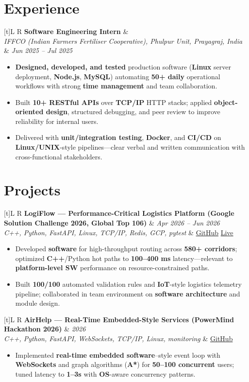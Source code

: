 \documentclass[a4paper,10pt]{article}
\newcommand{\resumeSubheading}[4]{%
  \vspace{0.5mm}
  \noindent
  \begin{tabularx}{\textwidth}[t]{L R}
    \textbf{#1} & #4 \\
    \textit{#3} & \textit{#2} \\
  \end{tabularx}
  \vspace{-0.5mm}%
}
\newcommand{\resumeProject}[4]{%
  \vspace{0.5mm}
  \noindent
  \begin{tabularx}{\textwidth}[t]{L R}
    \textbf{#1} & \textit{#3} \\
    \textit{#2} & #4 \\
  \end{tabularx}
  \vspace{-0.5mm}%
}
\begin{document}
\section{Experience}
\small
\resumeSubheading
  {Software Engineering Intern}{Jun 2025 -- Jul 2025}
  {IFFCO (Indian Farmers Fertiliser Cooperative), Phulpur Unit, Prayagraj, India}{}
\begin{itemize}
  \item \textbf{Designed, developed, and tested} production software (\textbf{Linux} server deployment, \textbf{Node.js}, \textbf{MySQL}) automating \textbf{50+ daily} operational workflows with strong \textbf{time management} and team collaboration.
  \item Built \textbf{10+ RESTful APIs} over \textbf{TCP/IP} HTTP stacks; applied \textbf{object-oriented design}, structured debugging, and peer review to improve reliability for internal users.
  \item Delivered with \textbf{unit/integration testing}, \textbf{Docker}, and \textbf{CI/CD} on \textbf{Linux/UNIX}-style pipelines---clear verbal and written communication with cross-functional stakeholders.
\end{itemize}

\section{Projects}
\small

\resumeProject
  {LogiFlow --- Performance-Critical Logistics Platform (Google Solution Challenge 2026, Global Top 106)}
  {C++, Python, FastAPI, Linux, TCP/IP, Redis, GCP, pytest}
  {Apr 2026 -- Jun 2026}
  {\href{https://github.com/Ojas-Srivastava05/LogiFlow-Solution-Challenge-2026}{GitHub} \textbar{} \href{https://logi-flow-solution-challenge-2026.vercel.app/}{Live}}
\begin{itemize}
  \item Developed \textbf{software} for high-throughput routing across \textbf{580+ corridors}; optimized \textbf{C++}/Python hot paths to \textbf{100--400 ms} latency---relevant to \textbf{platform-level SW} performance on resource-constrained paths.
  \item Built \textbf{100/100} automated validation rules and \textbf{IoT}-style logistics telemetry pipeline; collaborated in team environment on \textbf{software architecture} and module design.
\end{itemize}

\resumeProject
  {AirHelp --- Real-Time Embedded-Style Services (PowerMind Hackathon 2026)}
  {C++, Python, FastAPI, WebSockets, TCP/IP, Linux, monitoring}
  {2026}
  {\href{https://github.com/Ojas-Srivastava05/AirHelp-AI-Airport-Assistant}{GitHub}}
\begin{itemize}
  \item Implemented \textbf{real-time embedded software}--style event loop with \textbf{WebSockets} and graph algorithms (\textbf{A*}) for \textbf{50--100 concurrent} users; tuned latency to \textbf{1--3s} with \textbf{OS}-aware concurrency patterns.
\end{itemize}
\end{document}
